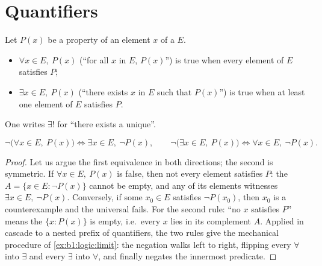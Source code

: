 \section{Quantifiers}

\begin{definition}[Quantifiers]\label{def:b1:logic:quantifiers}
Let $P(x)$ be a property of an element $x$ of a  $E$.
\begin{itemize}
  \item $\forall x \in E,\ P(x)$ (``for all $x$ in $E$, $P(x)$'') is
        true when every element of $E$ satisfies $P$;
  \item $\exists x \in E,\ P(x)$ (``there exists $x$ in $E$ such that
        $P(x)$'') is true when at least one element of $E$ satisfies
        $P$.
\end{itemize}
One writes $\exists!$ for ``there exists a unique''.
\end{definition}

\begin{proposition}\label{prop:b1:logic:negquant}
\[
\lnot\bigl(\forall x \in E,\ P(x)\bigr) \iff
\exists x \in E,\ \lnot P(x),
\qquad
\lnot\bigl(\exists x \in E,\ P(x)\bigr) \iff
\forall x \in E,\ \lnot P(x).
\]
\end{proposition}

\begin{proof}
Let us argue the first equivalence in both directions; the second
is symmetric. If $\forall x \in E,\ P(x)$ is false, then not every
element satisfies $P$: the  $A = \{x \in E : \lnot P(x)\}$
cannot be empty, and any of its elements witnesses $\exists x \in
E,\ \lnot P(x)$. Conversely, if some $x_0 \in E$ satisfies $\lnot
P(x_0)$, then $x_0$ is a counterexample and the universal 
fails. For the second rule: ``no $x$ satisfies $P$'' means the 
$\{x : P(x)\}$ is empty, i.e.\ every $x$ lies in its complement
$A$. Applied in cascade to a nested prefix of quantifiers, the two
rules give the mechanical procedure of \cref{ex:b1:logic:limit}:
the negation walks left to right, flipping every $\forall$ into
$\exists$ and every $\exists$ into $\forall$, and finally negates
the innermost predicate.
\end{proof}

